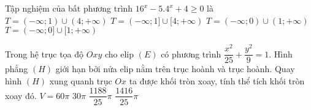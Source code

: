 \begin{ex}%
	Tập nghiệm của bất phương trình $16^x-5. 4^x+4\ge 0$ là
	\choice
	{$T=(-\infty; 1)\cup (4; +\infty )$}
	{$T=(-\infty; 1]\cup [4; +\infty )$}
	{$T=(-\infty; 0)\cup (1; +\infty )$}
	{\True $T=(-\infty; 0]\cup [1; +\infty )$}
	\loigiai{
		Đặt $t=4^x$, $t>0$. \\
		$16^x-5. 4^x+4\ge 0$ trở thành 
\begin{eqnarray*}
t^2-5. t+4\ge 0&\Leftrightarrow &\hoac{& t\ge 4 \\ & t\le 1}\\ 
&\Leftrightarrow &\hoac{& t\ge 4 \\ & 0<t\le 1}\\
&\Rightarrow &\hoac{& 4^x\ge 4 \\ & 0<4^x\le 1}\\
&\Leftrightarrow &\hoac{& x\ge 1 \\ & x\le 0.}
\end{eqnarray*}
Vậy $T=(-\infty; 0]\cup [1; +\infty )$.}
\end{ex}

\begin{ex}%
	Trong hệ trục tọa độ $Oxy$ cho elip $(E)$ có phương trình $\dfrac{x^2}{25}+\dfrac{y^2}{9}=1$. Hình phẳng $(H)$ giới hạn bởi nửa elip nằm trên trục hoành và trục hoành. Quay hình $(H)$ xung quanh trục $Ox$ ta được khối tròn xoay, tính thể tích khối tròn xoay đó.
	\choice
	{\True $V=60\pi $}
	{$30\pi $}
	{$\dfrac{1188}{25}\pi $}
	{$\dfrac{1416}{25}\pi $}
\end{ex}

